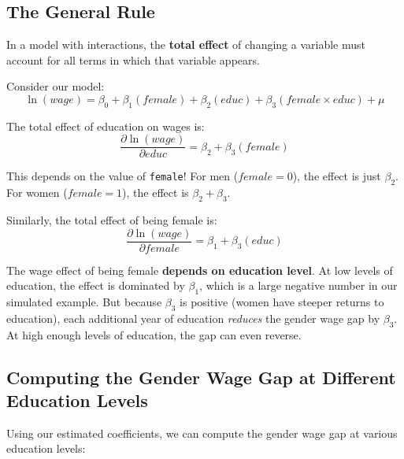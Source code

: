 \documentclass[
  letterpaper,
  DIV=11,
  numbers=noendperiod]{scrreprt}
\begin{document}
\subsection{The General Rule}\label{the-general-rule}

In a model with interactions, the \textbf{total effect} of changing a
variable must account for all terms in which that variable appears.

Consider our model: \[
\ln(wage) = \beta_0 + \beta_1(female) + \beta_2(educ) + \beta_3(female \times educ) + \mu
\]

The total effect of education on wages is: \[
\frac{\partial \ln(wage)}{\partial educ} = \beta_2 + \beta_3(female)
\]

This depends on the value of \texttt{female}! For men (\(female = 0\)),
the effect is just \(\beta_2\). For women (\(female = 1\)), the effect
is \(\beta_2 + \beta_3\).

Similarly, the total effect of being female is: \[
\frac{\partial \ln(wage)}{\partial female} = \beta_1 + \beta_3(educ)
\]

The wage effect of being female \textbf{depends on education level}. At
low levels of education, the effect is dominated by \(\beta_1\), which
is a large negative number in our simulated example. But because
\(\beta_3\) is positive (women have steeper returns to education), each
additional year of education \emph{reduces} the gender wage gap by
\(\beta_3\). At high enough levels of education, the gap can even
reverse.

\subsection{Computing the Gender Wage Gap at Different Education
Levels}\label{computing-the-gender-wage-gap-at-different-education-levels}

Using our estimated coefficients, we can compute the gender wage gap at
various education levels:
\end{document}
